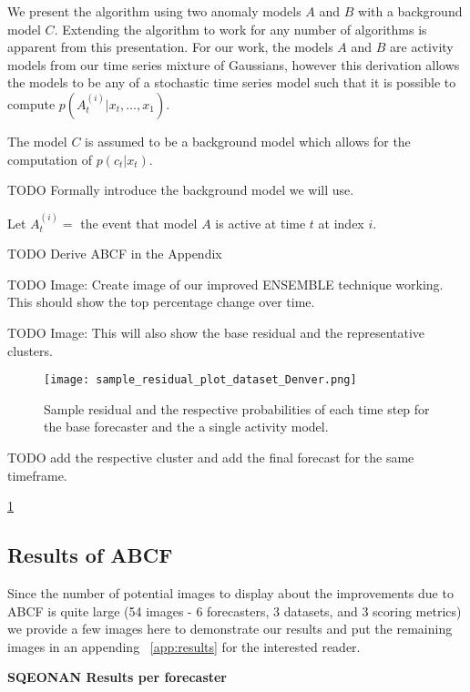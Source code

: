 We present the algorithm using two anomaly models $A$ and $B$ with a background model $C$.  Extending the algorithm to work for any number of algorithms is apparent from this presentation.  For our work, the models $A$ and $B$ are activity models from our time series mixture of Gaussians, however this derivation allows the models to be any of a stochastic time series model such that it is possible to compute $p(A^{(i)}_{t}|x_{t}, \ldots, x_{1})$.

The model $C$ is assumed to be a background model which allows for the computation of $p(c_{t}|x_{t})$.  

TODO Formally introduce the background model we will use.

Let $A_{t}^{(i)} = $ the event that model $A$ is active at time $t$ at index $i$.  

TODO Derive ABCF in the Appendix

TODO Image: Create image of our improved ENSEMBLE technique working.  This should show the top percentage change over time.

TODO Image: This will also show the base residual and the representative clusters.

\begin{figure}
	\begin{center}
		\texttt{[image: sample\_residual\_plot\_dataset\_Denver.png]}
	\end{center}
	\caption{Sample residual and the respective probabilities of each time step for the base forecaster and the a single activity model.}
	\label{fig:sample_abcf_residual}
\end{figure}

TODO add the respective cluster and add the final forecast for the same timeframe.

\ref{fig:sample_abcf_residual}

\subsection{Results of ABCF}
Since the number of potential images to display about the improvements due to ABCF is quite large (54 images - 6 forecasters, 3 datasets, and 3 scoring metrics) we provide a few images here to demonstrate our results and put the remaining images in an appending ~\ref{app:results} for the interested reader.

\bigskip
\noindent \textbf{SQEONAN Results per forecaster} \\

